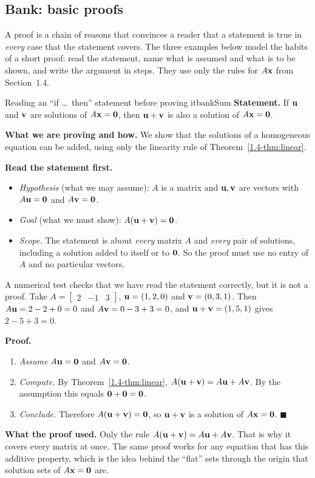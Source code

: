 \documentclass[11pt]{article}
\begin{document}
\subsection*{Bank: basic proofs}

A proof is a chain of reasons that convinces a reader that a statement is true in \emph{every} case that the statement covers. The three examples below model the habits of a short proof: read the statement, name what is assumed and what is to be shown, and write the argument in steps. They use only the rules for $A\mathbf{x}$ from Section~1.4.

\begin{exmp}{Reading an ``if \dots\ then'' statement before proving it}{bankSum}
\textbf{Statement.} If $\mathbf{u}$ and $\mathbf{v}$ are solutions of $A\mathbf{x}=\mathbf{0}$, then $\mathbf{u}+\mathbf{v}$ is also a solution of $A\mathbf{x}=\mathbf{0}$.

\textbf{What we are proving and how.} We show that the solutions of a homogeneous equation can be added, using only the linearity rule of Theorem~\ref{1.4-thm:linear}.

\textbf{Read the statement first.}
\begin{itemize}
  \item \emph{Hypothesis} (what we may assume): $A$ is a matrix and $\mathbf{u},\mathbf{v}$ are vectors with $A\mathbf{u}=\mathbf{0}$ and $A\mathbf{v}=\mathbf{0}$.
  \item \emph{Goal} (what we must show): $A(\mathbf{u}+\mathbf{v})=\mathbf{0}$.
  \item \emph{Scope.} The statement is about \emph{every} matrix $A$ and \emph{every} pair of solutions, including a solution added to itself or to $\mathbf{0}$. So the proof must use no entry of $A$ and no particular vectors.
\end{itemize}
A numerical test checks that we have read the statement correctly, but it is not a proof. Take $A=\begin{bmatrix}2&-1&3\end{bmatrix}$, $\mathbf{u}=(1,2,0)$ and $\mathbf{v}=(0,3,1)$. Then $A\mathbf{u}=2-2+0=0$ and $A\mathbf{v}=0-3+3=0$, and $\mathbf{u}+\mathbf{v}=(1,5,1)$ gives $2-5+3=0$.

\textbf{Proof.}
\begin{enumerate}[itemsep=2pt]
  \item \emph{Assume} $A\mathbf{u}=\mathbf{0}$ and $A\mathbf{v}=\mathbf{0}$.
  \item \emph{Compute.} By Theorem~\ref{1.4-thm:linear}, $A(\mathbf{u}+\mathbf{v})=A\mathbf{u}+A\mathbf{v}$. By the assumption this equals $\mathbf{0}+\mathbf{0}=\mathbf{0}$.
  \item \emph{Conclude.} Therefore $A(\mathbf{u}+\mathbf{v})=\mathbf{0}$, so $\mathbf{u}+\mathbf{v}$ is a solution of $A\mathbf{x}=\mathbf{0}$. \qquad$\blacksquare$
\end{enumerate}

\textbf{What the proof used.} Only the rule $A(\mathbf{u}+\mathbf{v})=A\mathbf{u}+A\mathbf{v}$. That is why it covers every matrix at once. The same proof works for any equation that has this additive property, which is the idea behind the ``flat'' sets through the origin that solution sets of $A\mathbf{x}=\mathbf{0}$ are.
\end{exmp}
\end{document}
